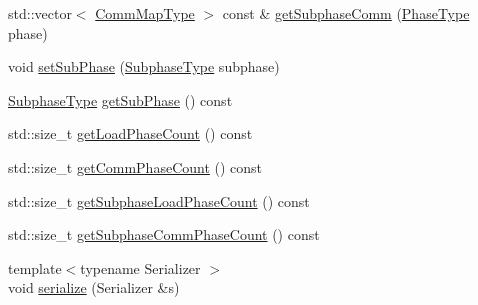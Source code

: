 \begin{DoxyCompactItemize}
\item 
std\+::vector$<$ \hyperlink{namespacevt_1_1vrt_1_1collection_1_1balance_a10860c956804d644db54a16012352728}{Comm\+Map\+Type} $>$ const  \& \hyperlink{structvt_1_1vrt_1_1collection_1_1balance_1_1_element_stats_a12d4f7166391b0e4283a287fde9d8202}{get\+Subphase\+Comm} (\hyperlink{namespacevt_a46ce6733d5cdbd735d561b7b4029f6d7}{Phase\+Type} phase)
\item 
void \hyperlink{structvt_1_1vrt_1_1collection_1_1balance_1_1_element_stats_a6f24460421195baa579f9a0dc7f6569c}{set\+Sub\+Phase} (\hyperlink{namespacevt_ae78cbfdf1e57470e33eedb074f2beeba}{Subphase\+Type} subphase)
\item 
\hyperlink{namespacevt_ae78cbfdf1e57470e33eedb074f2beeba}{Subphase\+Type} \hyperlink{structvt_1_1vrt_1_1collection_1_1balance_1_1_element_stats_aa6876c8014bf0b9c9bf0061ed70ad721}{get\+Sub\+Phase} () const
\item 
std\+::size\+\_\+t \hyperlink{structvt_1_1vrt_1_1collection_1_1balance_1_1_element_stats_a300b1f891b3ce2a664e65cf8c9023dbd}{get\+Load\+Phase\+Count} () const
\item 
std\+::size\+\_\+t \hyperlink{structvt_1_1vrt_1_1collection_1_1balance_1_1_element_stats_ac34adfb0df37bbd5b981363091de7b41}{get\+Comm\+Phase\+Count} () const
\item 
std\+::size\+\_\+t \hyperlink{structvt_1_1vrt_1_1collection_1_1balance_1_1_element_stats_a35c175b33e37c6813e6609bf6b36de25}{get\+Subphase\+Load\+Phase\+Count} () const
\item 
std\+::size\+\_\+t \hyperlink{structvt_1_1vrt_1_1collection_1_1balance_1_1_element_stats_a47ea99d9d62ee429178798dba89b53ab}{get\+Subphase\+Comm\+Phase\+Count} () const
\item 
{\footnotesize template$<$typename Serializer $>$ }\\void \hyperlink{structvt_1_1vrt_1_1collection_1_1balance_1_1_element_stats_a2a329a760a794097651a78157cf12452}{serialize} (Serializer \&s)
\end{DoxyCompactItemize}
